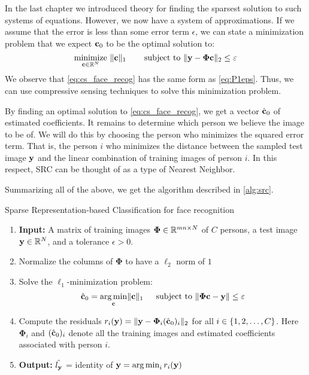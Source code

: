 In the last chapter we introduced theory for finding the sparsest solution to such systems of equations. However, we now have a system of approximations. If we assume that the error is less than some error term $ \epsilon $, we can state a minimization problem that we expect $ \mathbf{c}_{0} $ to be the optimal solution to:
\begin{equation}
	\label{eq:cs_face_recog}
	\underset{\mathbf{c} \in \mathbb{R}^{N}}{\text{minimize}}~ \lVert\mathbf{c}\rVert_{1} \quad\quad\operatorname*{subject~to}~ \lVert\mathbf{y} - \mathbf{\Phi}\mathbf{c}\rVert_{2} \leq \varepsilon
\end{equation}
We observe that \eqref{eq:cs_face_recog} has the same form as \eqref{eq:P1eps}. Thus, we can use compressive sensing techniques to solve this minimization problem. 

By finding an optimal solution to \eqref{eq:cs_face_recog}, we get a vector $ \hat{\mathbf{c}}_{0} $ of estimated coefficients. It remains to determine which person we believe the image to be of. We will do this by choosing the person who minimizes the squared error term. That is, the person $ i $ who minimizes the distance between the sampled test image $ \mathbf{y} $ and the linear combination of training images of person $ i $. In this respect, SRC can be thought of as a type of Nearest Neighbor. 

Summarizing all of the above, we get the algorithm described in \cref{alg:src}. 



\begin{algorithm}[tb]
	\caption{Sparse Representation-based Classification for face recognition}
	\label{alg:src}
	\begin{enumerate}
		\itemsep0em 
		\renewcommand{\parsep}{0pt}
		\renewcommand{\parskip}{0pt}
		\renewcommand{\itemsep}{0pt}
		\item[] \textbf{Input:} A matrix of training images $ \mathbf{\Phi} \in \mathbb{R}^{mn\times N} $ of $ C $ persons, a test image $ \mathbf{y}\in\mathbb{R}^{N} $, and a tolerance $ \epsilon > 0 $.
		\item Normalize the columns of $ \mathbf{\Phi} $ to have a $ \ell_{2} $ norm of $ 1 $
		\item Solve the $ \ell_{1} $-minimization problem:
		\begin{equation}
			\hat{\mathbf{c}}_{0} = \operatorname*{arg\,min}_{\mathbf{c}} \lVert\mathbf{c}\rVert_{1} ~\quad\operatorname*{subject~to}~ \lVert\mathbf{\Phi}\mathbf{c} - \mathbf{y}\rVert \leq \varepsilon
			\label{eq:src}
		\end{equation}
		\item Compute the residuals $ r_{i}(\mathbf{y}) = \lVert\mathbf{y} - \mathbf{\Phi}_{i}(\hat{\mathbf{c}}_{0})_{i}\rVert_{2} $ for all $ i \in \{1, 2, \ldots, C\} $. Here $ \mathbf{\Phi}_{i} $ and $ (\hat{\mathbf{c}}_{0})_{i} $ denote all the training images and estimated coefficients associated with person $ i $. 
		\item[] \textbf{Output:} $ \hat{l_{\mathbf{y}}} $ = identity of $ \mathbf{y} = \operatorname*{arg\,min}_{i} r_{i}(\mathbf{y}) $  
	\end{enumerate}
\end{algorithm}


